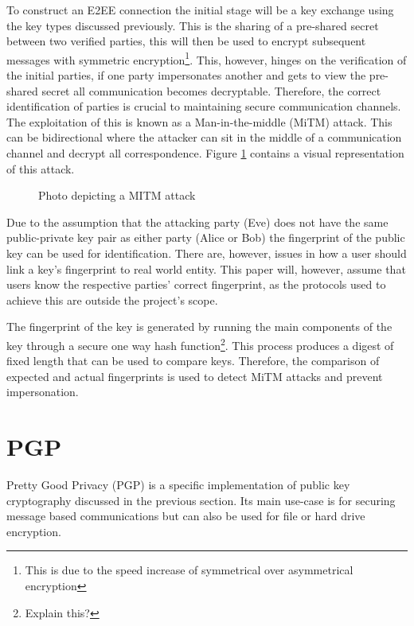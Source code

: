 To construct an E2EE connection the initial stage will be a key exchange using the key types discussed previously. This is the sharing of a pre-shared secret between two verified parties, this will then be used to encrypt subsequent messages with symmetric encryption\footnote{This is due to the speed increase of symmetrical over asymmetrical encryption}. This, however, hinges on the verification of the initial parties, if one party impersonates another and gets to view the pre-shared secret all communication becomes decryptable. Therefore, the correct identification of parties is crucial to maintaining secure communication channels. The exploitation of this is known as a Man-in-the-middle (MiTM) attack. This can be bidirectional where the attacker can sit in the middle of a communication channel and decrypt all correspondence. Figure \ref{fig:mitm} contains a visual representation of this attack.

\begin{center}
    
    \begin{figure}[h]
        \caption{Photo depicting a MITM attack}
        \label{fig:mitm}
    \end{figure}
\end{center}

Due to the assumption that the attacking party (Eve) does not have the same public-private key pair as either party (Alice or Bob) the fingerprint of the public key can be used for identification. There are, however, issues in how a user should link a key's fingerprint to real world entity. This paper will, however, assume that users know the respective parties' correct fingerprint, as the protocols used to achieve this are outside the project's scope.

The fingerprint of the key is generated by running the main components of the key through a secure one way hash function\footnote{Explain this?}. This process produces a digest of fixed length that can be used to compare keys. Therefore, the comparison of expected and actual fingerprints is used to detect MiTM attacks and prevent impersonation.

\section{PGP}
Pretty Good Privacy (PGP) is a specific implementation of public key cryptography discussed in the previous section. Its main use-case is for securing message based communications but can also be used for file or hard drive encryption.

